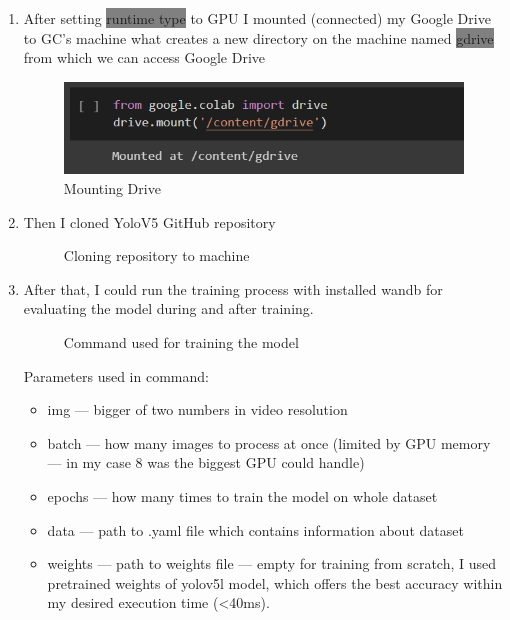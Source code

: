 \begin{enumerate}
    \item After setting \colorbox{Gray}{runtime type} to GPU I mounted (connected) my Google Drive to GC's machine what creates a new directory on the machine named \colorbox{Gray}{gdrive} from which we can access Google Drive
    \newline \begin{figure} [H]
        \centering
        \includegraphics{images/train1}
        \caption{Mounting Drive}
        \label{fig:train1}
    \end{figure}
    \item Then I cloned YoloV5 GitHub repository
    \newline \begin{figure} [H]
        \centering
        \caption{Cloning repository to machine}
        \label{fig:train2}
    \end{figure}
    \item After that, I could run the training process with installed wandb for evaluating the model during and after training.
    \newline \begin{figure} [H]
        \centering
        \caption{Command used for training the model}
        \label{fig:train3}
    \end{figure}
    Parameters used in command:
    \begin{itemize}
        \item img --- bigger of two numbers in video resolution
        \item batch --- how many images to process at once (limited by GPU memory --- in my case 8 was the biggest GPU could handle)
        \item epochs --- how many times to train the model on whole dataset
        \item data --- path to .yaml file which contains information about dataset
        \item weights --- path to weights file --- empty for training from scratch, I used pretrained weights of yolov5l model, which offers the best accuracy within my desired execution time (<40ms).
    \end{itemize}
\end{enumerate}

